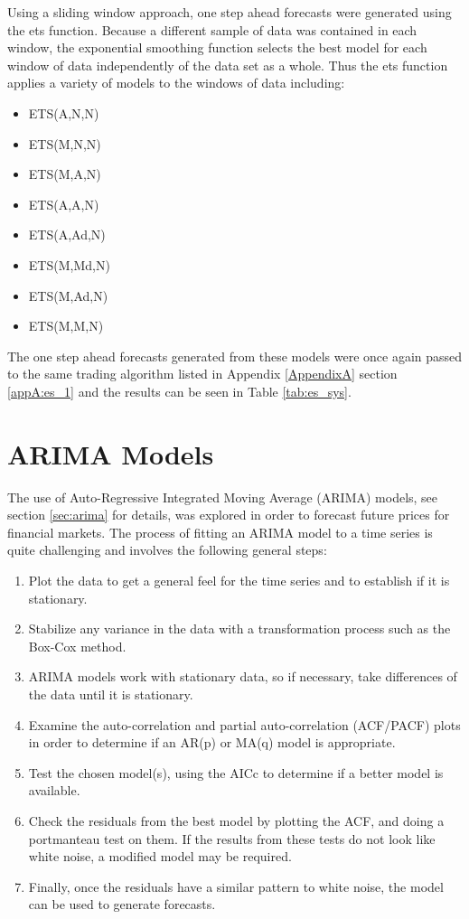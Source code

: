 
Using a sliding window approach, one step ahead forecasts were generated using the ets function. Because a different sample of data was contained in each window, the exponential smoothing function selects the best model for each window of data independently of the data set as a whole. Thus the ets function applies a variety of models to the windows of data including:

\begin{itemize}
\item ETS(A,N,N)
\item ETS(M,N,N)
\item ETS(M,A,N)
\item ETS(A,A,N)
\item ETS(A,Ad,N)
\item ETS(M,Md,N)
\item ETS(M,Ad,N)
\item ETS(M,M,N)
\end{itemize}


The one step ahead forecasts generated from these models were once again passed to the same trading algorithm listed in Appendix \ref{AppendixA} section \ref{appA:es_1} and the results can be seen in Table \ref{tab:es_sys}.



\section{ARIMA Models}
\label{arima_models}
The use of Auto-Regressive Integrated Moving Average (ARIMA) models, see section \ref{sec:arima} for details, was explored in order to forecast future prices for financial markets. 
The process of fitting an ARIMA model to a time series is quite challenging and involves the following general steps:

\begin{enumerate}
\item Plot the data to get a general feel for the time series and to establish if it is stationary.
\item Stabilize any variance in the data with a transformation process such as the Box-Cox method.
\item ARIMA models work with stationary data, so if necessary, take differences of the data until it is stationary.
\item Examine the auto-correlation and partial auto-correlation (ACF/PACF) plots in order to determine if an AR(p) or MA(q) model is appropriate.
\item Test the chosen model(s), using the AICc to determine if a better model is available.
\item Check the residuals from the best model by plotting the ACF, and doing a portmanteau test on them. If the results from these tests do not look like white noise, a modified model may be required.
\item Finally, once the residuals have a similar pattern to white noise, the model can be used to generate forecasts.
\end{enumerate}


